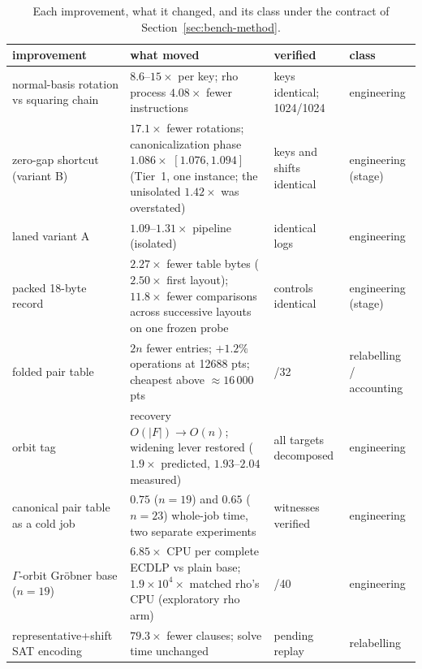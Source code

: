 \begin{table}[t]
\centering\small
\caption{Each improvement, what it changed, and its class under the contract of Section~\ref{sec:bench-method}.}
\label{tab:survives}
\begin{tabularx}{\textwidth}{@{}>{\raggedright\arraybackslash}p{}X>{\raggedright\arraybackslash}p{}>{\raggedright\arraybackslash}p{}@{}}
\toprule
improvement & what moved & verified & class \\
\midrule
normal-basis rotation vs squaring chain & $8.6$--$15\times$ per key; rho process $4.08\times$ fewer instructions & keys identical; 1024/1024 & engineering \\
zero-gap shortcut (variant B) & $17.1\times$ fewer rotations; canonicalization phase $1.086\times$ $[1.076,1.094]$ (Tier~1, one instance; the unisolated $1.42\times$ was overstated) & keys and shifts identical & engineering (stage) \\
laned variant A & $1.09$--$1.31\times$ pipeline (isolated) & identical logs & engineering \\
packed 18-byte record & $2.27\times$ fewer table bytes ($2.50\times$ first layout); $11.8\times$ fewer comparisons across successive layouts on one frozen probe & controls identical & engineering (stage) \\
folded pair table & $2n$ fewer entries; $+1.2\%$ operations at 12688 pts; cheapest above $\approx16\,000$ pts & 32/32 & relabelling / accounting \\
orbit tag & recovery $O(|F|)\to O(n)$; widening lever restored ($1.9\times$ predicted, $1.93$--$2.04$ measured) & all targets decomposed & engineering \\
canonical pair table as a cold job & $0.75$ ($n=19$) and $0.65$ ($n=23$) whole-job time, two separate experiments & witnesses verified & engineering \\
$\Gamma$-orbit Gr\"obner base ($n=19$) & $6.85\times$ CPU per complete ECDLP vs plain base; $1.9\times10^4\times$ matched rho's CPU (exploratory rho arm) & 40/40 & engineering \\
representative+shift SAT encoding & $79.3\times$ fewer clauses; solve time unchanged & pending replay & relabelling \\
\bottomrule
\end{tabularx}
\end{table}
